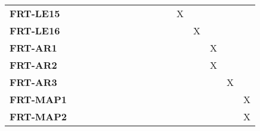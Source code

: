 \documentclass[12pt, titlepage]{article}
\begin{document}
\begin{landscape}
\begin{longtable}{|l|cccccccccccc|}
		\textbf{FRT-LE15} & ~                                                         & ~             & ~             & ~             & ~             & ~             & ~             & X             & ~             & ~             & ~ &~\\
		\textbf{FRT-LE16} & ~                                                         & ~             & ~             & ~             & ~             & ~             & ~             & ~             & X             & ~             & ~ &~\\
		\textbf{FRT-AR1} & ~                                                         & ~             & ~             & ~             & ~             & ~             & ~             & ~             & ~             & X             & ~ &~\\
		\textbf{FRT-AR2} & ~                                                         & ~             & ~             & ~             & ~             & ~             & ~             & ~             & ~             & X             & ~ &~\\
		\textbf{FRT-AR3} & ~                                                         & ~             & ~             & ~             & ~             & ~             & ~             & ~             & ~             & ~             & X &~\\
		\textbf{FRT-MAP1} & ~                                                         & ~             & ~             & ~             & ~             & ~             & ~             & ~             & ~             & ~             & ~ &X\\
		\textbf{FRT-MAP2} & ~                                                         & ~             & ~             & ~             & ~             & ~             & ~             & ~             & ~             & ~             & ~ &X\\
		\hline
	\end{longtable}

	\newpage
	

\end{landscape}
\end{document}
